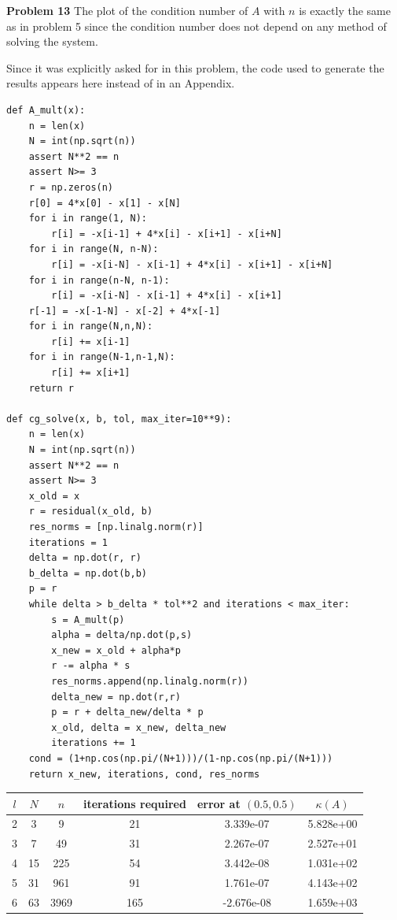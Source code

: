\documentclass[12pt]{article}
\newcommand{\problem}[1]{\hspace{-4 ex} \large \textbf{Problem #1} }
\begin{document}
\bigbreak

\problem{13 } The plot of the condition number of $A$ with $n$ is exactly the same as in problem 5 since the condition number does not depend on any method of solving the system. 

Since it was explicitly asked for in this problem, the code used to generate the results appears here instead of in an Appendix.

\begin{lstlisting}
def A_mult(x):
	n = len(x)
	N = int(np.sqrt(n))
	assert N**2 == n
	assert N>= 3
	r = np.zeros(n)
	r[0] = 4*x[0] - x[1] - x[N]
	for i in range(1, N):
		r[i] = -x[i-1] + 4*x[i] - x[i+1] - x[i+N]
	for i in range(N, n-N):
		r[i] = -x[i-N] - x[i-1] + 4*x[i] - x[i+1] - x[i+N]
	for i in range(n-N, n-1):
		r[i] = -x[i-N] - x[i-1] + 4*x[i] - x[i+1]
	r[-1] = -x[-1-N] - x[-2] + 4*x[-1]
	for i in range(N,n,N):
		r[i] += x[i-1]
	for i in range(N-1,n-1,N):
		r[i] += x[i+1]
	return r

def cg_solve(x, b, tol, max_iter=10**9):
	n = len(x)
	N = int(np.sqrt(n))
	assert N**2 == n
	assert N>= 3
	x_old = x
	r = residual(x_old, b)
	res_norms = [np.linalg.norm(r)]
	iterations = 1
	delta = np.dot(r, r)
	b_delta = np.dot(b,b)
	p = r
	while delta > b_delta * tol**2 and iterations < max_iter:
		s = A_mult(p)
		alpha = delta/np.dot(p,s)
		x_new = x_old + alpha*p
		r -= alpha * s
		res_norms.append(np.linalg.norm(r))
		delta_new = np.dot(r,r)
		p = r + delta_new/delta * p
		x_old, delta = x_new, delta_new
		iterations += 1
	cond = (1+np.cos(np.pi/(N+1)))/(1-np.cos(np.pi/(N+1)))
	return x_new, iterations, cond, res_norms
\end{lstlisting}

	\begin{center}
		\begin{tabular}{|c|c|c|c|c|c|}
			\hline
			$l$&$N$&$n$&iterations required&error at $(0.5,0.5)$&$\kappa(A)$\\ \hline
			2&3&9&21&3.339e-07&5.828e+00\\ \hline
			3&7&49&31&2.267e-07&2.527e+01\\ \hline
			4&15&225&54&3.442e-08&1.031e+02\\ \hline
			5&31&961&91&1.761e-07&4.143e+02\\ \hline
			6&63&3969&165&-2.676e-08&1.659e+03\\ \hline
		\end{tabular}
	\end{center}
		
\end{document}
